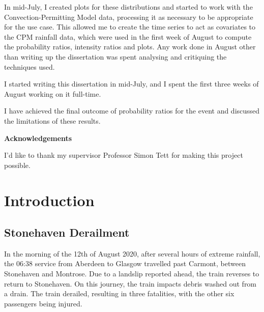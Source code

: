 \documentclass[12pt,a4paper,openany]{report}
\begin{document}
In mid-July, I created plots for these distributions and started to work with the Convection-Permitting Model data,
    processing it as necessary to be appropriate for the use case.
This allowed me to create the time series to act as covariates to the CPM rainfall data,
    which were used in the first week of August to compute the probability ratios, intensity ratios and plots.
Any work done in August other than writing up the dissertation was spent analysing and critiquing the techniques used.

I started writing this dissertation in mid-July, and I spent the first
three weeks of August working on it full-time.

I have achieved the final outcome of probability ratios for the event and
    discussed the limitations of these results.


\newpage

\begin{center}
\textbf{Acknowledgements}
\end{center}

I'd like to thank my supervisor Professor Simon Tett for
making this project possible.


\newpage
\tableofcontents
\newpage
\listoftables
\newpage
\listoffigures


\chapter{Introduction}\label{ch:intro}

\section{Stonehaven Derailment}\label{sec:stonederail}

In the morning of the 12th of August 2020,
    after several hours of extreme rainfall,
    the 06:38 service from Aberdeen to Glasgow travelled past Carmont,
    between Stonehaven and Montrose.
Due to a landslip reported ahead,
    the train reverses to return to Stonehaven.
On this journey,
    the train impacts debris washed out from a drain.
The train derailed,
    resulting in three fatalities,
    with the other six passengers being injured.
\end{document}
